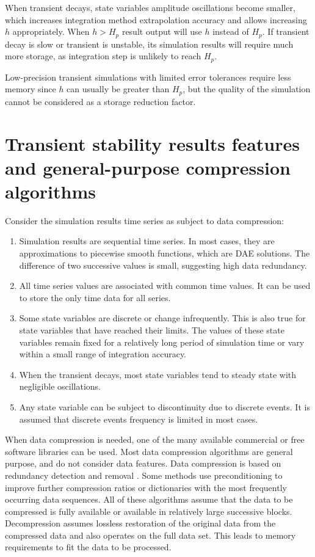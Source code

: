 \documentclass[conference]{IEEEtran}
\begin{document}
When transient decays, state variables amplitude oscillations become smaller, which increases
integration method extrapolation accuracy and allows increasing \(h\) appropriately.
When \(h>H_p\) result output will use \(h\) instead of \(H_p\). If transient decay is slow or
transient is unstable, its simulation results will require much more storage, as integration
step is unlikely to reach \(H_p\). 

Low-precision transient simulations with limited error tolerances require less memory since \(h\) can usually be
greater than \(H_p\), but the quality of the simulation cannot be considered as a storage reduction factor.

\section{Transient stability results features and general-purpose compression algorithms}
Consider the simulation results time series as subject to data compression:

\begin{enumerate}
	\item{Simulation results are sequential time series. In most cases, they are approximations
		to piecewise smooth functions, which are DAE solutions. The difference of two successive
		values is small, suggesting high data redundancy.}
	\item{All time series values are associated with common time values. It can be used to store the only time data for all series.}
	\item{Some state variables are discrete or change infrequently. This is also true for state variables that have reached their limits. The values of these state variables remain fixed for a relatively long period of simulation time or vary within a small range of integration accuracy.}
	\item{When the transient decays, most state variables tend to steady state with negligible oscillations.}
	\item{Any state variable can be subject to discontinuity due to discrete events. It is assumed that discrete events frequency is limited in most cases. }
\end{enumerate}

When data compression is needed, one of the many available commercial or free software libraries can be used.
Most data compression algorithms are general purpose, and do not consider data features.
Data compression is based on redundancy detection and removal \cite{lzw77,welch84}. 
Some methods use preconditioning to improve further compression ratios \cite{bwt94} or dictionaries 
with the most frequently occurring data sequences.  All of these algorithms assume that the data to be compressed is
fully available or available in relatively large successive blocks. Decompression assumes 
lossless restoration of the original data from the compressed data and also operates on the full data set. 
This leads to memory requirements to fit the data to be processed.
\end{document}
